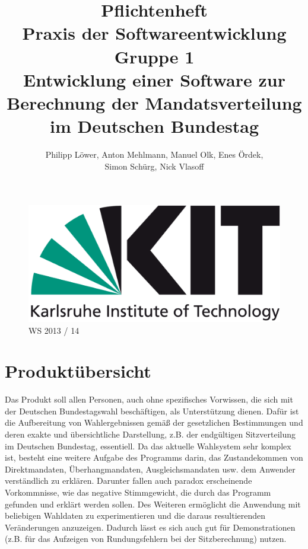 \documentclass[10pt,a4paper]{article}
\title{\Huge Pflichtenheft\\[1cm] {\bfseries Praxis der Softwareentwicklung}\\Gruppe 1\\[2cm] Entwicklung einer Software zur Berechnung der Mandatsverteilung im Deutschen Bundestag\\[1cm] }
\author{Philipp Löwer, Anton Mehlmann, Manuel Olk, Enes Ördek, \\Simon Schürg, Nick Vlasoff}
\date{}
\begin{document}
\maketitle

\begin{figure}[h]

\centering
		
		\includegraphics[scale=0.6]{KIT-Logo.png}\\
		\Huge WS 2013 / 14
\end{figure}

		
\newpage
\tableofcontents
\newpage 

\section{Produktübersicht}
Das Produkt soll allen Personen, auch ohne spezifisches Vorwissen, die sich mit der Deutschen Bundestagswahl beschäftigen, als Unterstützung dienen.\newline
Dafür ist die Aufbereitung von Wahlergebnissen gemäß der gesetzlichen Bestimmungen und deren exakte und übersichtliche Darstellung, z.B. der endgültigen Sitzverteilung im Deutschen Bundestag, essentiell.
Da das aktuelle Wahlsystem sehr komplex ist, besteht eine weitere Aufgabe des Programms darin, das Zustandekommen von Direktmandaten, Überhangmandaten, Ausgleichsmandaten usw. dem Anwender verständlich zu erklären.
Darunter fallen auch paradox erscheinende Vorkommnisse, wie das negative Stimmgewicht, die durch das Programm gefunden und erklärt werden sollen. \newline
Des Weiteren ermöglicht die Anwendung mit beliebigen Wahldaten zu experimentieren und die daraus resultierenden Veränderungen anzuzeigen. Dadurch lässt es sich auch gut für Demonstrationen (z.B. für das Aufzeigen von Rundungsfehlern bei der Sitzberechnung) nutzen.
\end{document}

